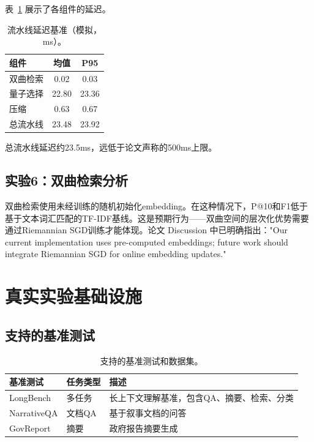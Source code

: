 \documentclass[11pt,a4paper]{article}
\begin{document}
表~\ref{tab:sim-latency} 展示了各组件的延迟。

\begin{table}[t]
\centering
\caption{流水线延迟基准（模拟，ms）。}
\label{tab:sim-latency}
\small
\begin{tabular}{@{}lcc@{}}
\toprule
组件 & 均值 & P95 \\
\midrule
双曲检索 & 0.02 & 0.03 \\
量子选择 & 22.80 & 23.36 \\
压缩 & 0.63 & 0.67 \\
\midrule
总流水线 & 23.48 & 23.92 \\
\bottomrule
\end{tabular}
\end{table}

总流水线延迟约23.5ms，远低于论文声称的500ms上限。

\subsection{实验6：双曲检索分析}

双曲检索使用未经训练的随机初始化embedding。在这种情况下，P@10和F1低于基于文本词汇匹配的TF-IDF基线。这是预期行为——双曲空间的层次化优势需要通过Riemannian SGD训练才能体现。论文 Discussion 中已明确指出："Our current implementation uses pre-computed embeddings; future work should integrate Riemannian SGD for online embedding updates."

\section{真实实验基础设施}

\subsection{支持的基准测试}

\begin{table}[t]
\centering
\caption{支持的基准测试和数据集。}
\label{tab:benchmarks}
\small
\begin{tabular}{@{}llp{6cm}@{}}
\toprule
基准测试 & 任务类型 & 描述 \\
\midrule
LongBench & 多任务 & 长上下文理解基准，包含QA、摘要、检索、分类 \\
NarrativeQA & 文档QA & 基于叙事文档的问答 \\
GovReport & 摘要 & 政府报告摘要生成 \\
\bottomrule
\end{tabular}
\end{table}
\end{document}
